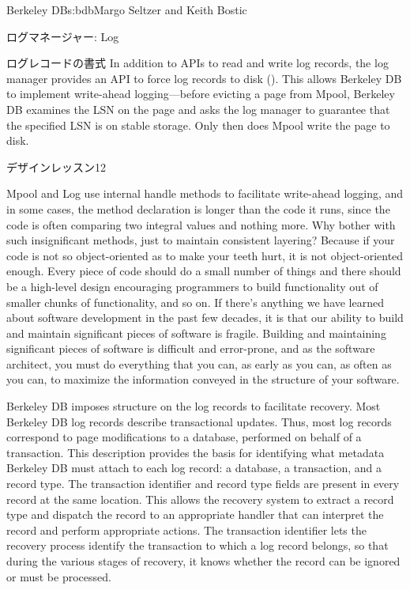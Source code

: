 \begin{aosachapter}{Berkeley DB}{s:bdb}{Margo Seltzer and Keith Bostic}
\begin{aosasect1}{ログマネージャー: Log}
\begin{aosasect2}{ログレコードの書式}
In addition to APIs to read and write log records, the log manager
provides an API to force log records to disk
().  This allows Berkeley DB to
implement write-ahead logging---before evicting a page from Mpool,
Berkeley DB examines the LSN on the page and asks the log manager to
guarantee that the specified LSN is on stable storage. Only then does
Mpool write the page to disk. 

\begin{aosabox}{デザインレッスン12}

Mpool and Log use internal handle methods to facilitate write-ahead
logging, and in some cases, the method declaration is longer than the
code it runs, since the code is often comparing two integral values
and nothing more. Why bother with such insignificant methods, just to
maintain consistent layering?  Because if your code is not so
object-oriented as to make your teeth hurt, it is not object-oriented
enough. Every piece of code should do a small number of things and
there should be a high-level design encouraging programmers to build
functionality out of smaller chunks of functionality, and so on. If
there's anything we have learned about software development in the
past few decades, it is that our ability to build and maintain
significant pieces of software is fragile. Building and maintaining
significant pieces of software is difficult and error-prone, and as
the software architect, you must do everything that you can, as early
as you can, as often as you can, to maximize the information conveyed
in the structure of your software.

\end{aosabox}

Berkeley DB imposes structure on the log records to facilitate
recovery.  Most Berkeley DB log records describe transactional
updates. Thus, most log records correspond to page modifications to a
database, performed on behalf of a transaction. This description
provides the basis for identifying what metadata Berkeley DB must
attach to each log record: a database, a transaction, and a record
type. The transaction identifier and record type fields are present in every
record at the same location.  This allows the recovery system to
extract a record type and dispatch the record to an appropriate
handler that can interpret the record and perform appropriate
actions. The transaction identifier lets the recovery process identify the
transaction to which a log record belongs, so that during the various
stages of recovery, it knows whether the record can be ignored or must
be processed.


\end{aosasect2}
\end{aosasect1}
\end{aosachapter}
